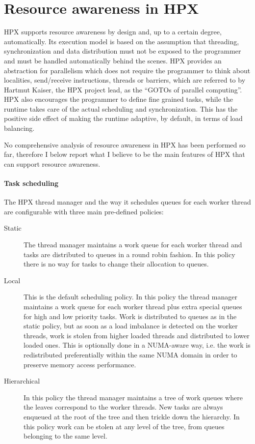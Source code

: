 \section{Resource awareness in HPX} \label{sec:hpxRAC}
HPX supports resource awareness by design and, up to a certain degree, automatically.
Its execution model is based on the assumption that threading, synchronization and data distribution must not be exposed to the programmer and must be handled automatically behind the scenes. HPX provides an abstraction for parallelism which does not require the programmer to think about localities, send/receive instructions, threads or barriers, which are referred to by Hartmut Kaiser, the HPX project lead, as the ``GOTOs of parallel computing''\cite{kaiser2014goto}. HPX also encourages the programmer to define fine grained tasks, while the runtime takes care of the actual scheduling and synchronization. This has the positive side effect of making the runtime adaptive, by default, in terms of load balancing.

No comprehensive analysis of resource awareness in HPX has been performed so far, therefore I below report what I believe to be the main features of HPX that can support resource awareness.

\paragraph{Task scheduling}
The HPX thread manager and the way it schedules queues for each worker thread are configurable with three main pre-defined policies\cite{heller2017hpx,amatya2014parallel}:
\begin{description}
	\item [Static] The thread manager maintains a work queue for each worker thread and tasks are distributed to queues in a round robin fashion. In this policy there is no way for tasks to change their allocation to queues.
	\item [Local] This is the default scheduling policy. In this policy the thread manager maintains a work queue for each worker thread plus extra special queues for high and low priority tasks. Work is distributed to queues as in the static policy, but as soon as a load imbalance is detected on the worker threads, work is stolen from higher loaded threads and distributed to lower loaded ones. This is optionally done in a NUMA-aware way, i.e. the work is redistributed preferentially within the same NUMA domain in order to preserve memory access performance.
	\item [Hierarchical] In this policy the thread manager maintains a tree of work queues where the leaves correspond to the worker threads. New tasks are always enqueued at the root of the tree and then trickle down the hierarchy. In this policy work can be stolen at any level of the tree, from queues belonging to the same level.
\end{description}

